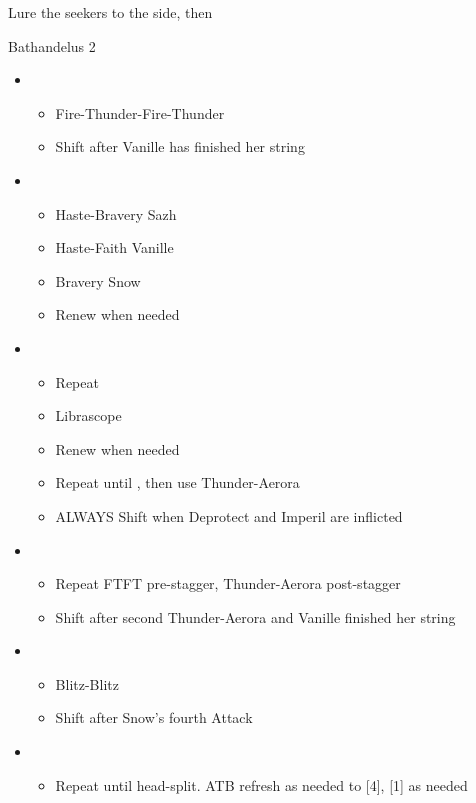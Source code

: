 \documentclass{report}
\begin{document}
Lure the seekers to the side, then 

\begin{battle}{Bathandelus 2}
\begin{multicols}{2}
\begin{itemize}
    \item \third
    \begin{itemize}
        \item Fire-Thunder-Fire-Thunder
        \item Shift after Vanille has finished her string
    \end{itemize}
    \item \fifth
    \begin{itemize}
        \item Haste-Bravery Sazh
        \item Haste-Faith Vanille
        \item Bravery Snow
        \item Renew when needed
    \end{itemize}
    \item \third
    \begin{itemize}
        \item Repeat
        \item Librascope
        \item Renew when needed
        \item Repeat until \stagger, then use Thunder-Aerora
        \item ALWAYS Shift when Deprotect and Imperil are inflicted
    \end{itemize}
    \item \second
    \begin{itemize}
        \item Repeat FTFT pre-stagger, Thunder-Aerora post-stagger
        \item Shift after second Thunder-Aerora and Vanille finished her string
    \end{itemize}
    \item \first
    \begin{itemize}
        \item Blitz-Blitz
        \item Shift after Snow's fourth Attack
    \end{itemize}
    \item \sixth
    \begin{itemize}
        \item Repeat until head-split. ATB refresh as needed to [4], [1] as needed

\end{itemize}
\end{itemize}
\end{multicols}
\end{battle}
\end{document}
